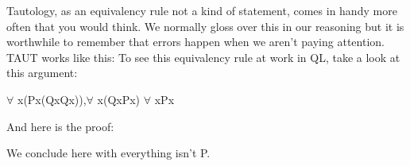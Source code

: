 Tautology, as an equivalency rule not a kind of statement, comes in handy more often that you would think. We normally gloss over this in our reasoning but it is worthwhile to remember that errors happen when we aren't paying attention. TAUT works like this:
To see this equivalency rule at work in QL, take a look at this argument:
\begin{center}
$\forall$ x(Px\eif (Qx\eand Qx)),$\forall$ x(Qx\eif \enot Px) \therefore  $\forall$ x\enot Px
\end{center}
And here is the proof:
\begin{fitchproof}
\end{fitchproof}

We conclude here with everything isn't P. 
